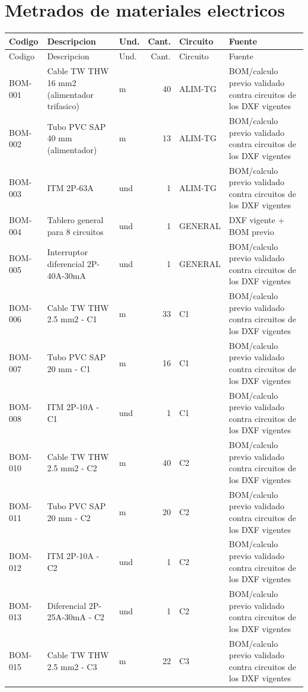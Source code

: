 \section{Metrados de materiales electricos}
\scriptsize
\begin{longtable}{p{1.5cm}p{5.5cm}p{0.8cm}r p{1.2cm}p{4.0cm}}
\toprule Codigo & Descripcion & Und. & Cant. & Circuito & Fuente \\ \midrule
\endfirsthead\toprule Codigo & Descripcion & Und. & Cant. & Circuito & Fuente \\ \midrule\endhead
BOM-001 & Cable TW THW 16 mm2 (alimentador trifasico) & m & 40 & ALIM-TG & BOM/calculo previo validado contra circuitos de los DXF vigentes \\
BOM-002 & Tubo PVC SAP 40 mm (alimentador) & m & 13 & ALIM-TG & BOM/calculo previo validado contra circuitos de los DXF vigentes \\
BOM-003 & ITM 2P-63A & und & 1 & ALIM-TG & BOM/calculo previo validado contra circuitos de los DXF vigentes \\
BOM-004 & Tablero general para 8 circuitos & und & 1 & GENERAL & DXF vigente + BOM previo \\
BOM-005 & Interruptor diferencial 2P-40A-30mA & und & 1 & GENERAL & BOM/calculo previo validado contra circuitos de los DXF vigentes \\
BOM-006 & Cable TW THW 2.5 mm2 - C1 & m & 33 & C1 & BOM/calculo previo validado contra circuitos de los DXF vigentes \\
BOM-007 & Tubo PVC SAP 20 mm - C1 & m & 16 & C1 & BOM/calculo previo validado contra circuitos de los DXF vigentes \\
BOM-008 & ITM 2P-10A - C1 & und & 1 & C1 & BOM/calculo previo validado contra circuitos de los DXF vigentes \\
BOM-010 & Cable TW THW 2.5 mm2 - C2 & m & 40 & C2 & BOM/calculo previo validado contra circuitos de los DXF vigentes \\
BOM-011 & Tubo PVC SAP 20 mm - C2 & m & 20 & C2 & BOM/calculo previo validado contra circuitos de los DXF vigentes \\
BOM-012 & ITM 2P-10A - C2 & und & 1 & C2 & BOM/calculo previo validado contra circuitos de los DXF vigentes \\
BOM-013 & Diferencial 2P-25A-30mA - C2 & und & 1 & C2 & BOM/calculo previo validado contra circuitos de los DXF vigentes \\
BOM-015 & Cable TW THW 2.5 mm2 - C3 & m & 22 & C3 & BOM/calculo previo validado contra circuitos de los DXF vigentes \\

\end{longtable}

